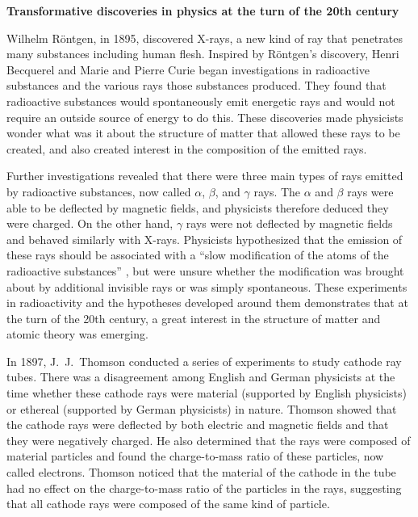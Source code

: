 \documentclass[12pt, oneside, letterpaper, fleqn]{article}
\begin{document}
\begin{center}
\textbf{Transformative discoveries in physics at the turn of the 20th
century}
\end{center}

Wilhelm R\"ontgen, in 1895, discovered X-rays, a new kind of ray that
penetrates many substances including human flesh. Inspired by
R\"ontgen's discovery, Henri Becquerel and Marie and Pierre Curie began
investigations in radioactive substances and the various rays those
substances produced. They found that radioactive substances would
spontaneously emit energetic rays and would not require an outside
source of energy to do this. These discoveries made physicists wonder
what was it about the structure of matter that allowed these rays to be
created, and also created interest in the composition of the emitted
rays.

Further investigations revealed that there were three main types of rays
emitted by radioactive substances, now called $\alpha$, $\beta$, and
$\gamma$ rays. The $\alpha$ and $\beta$ rays were able to be deflected
by magnetic fields, and physicists therefore deduced they were charged.
On the other hand, $\gamma$ rays were not deflected by magnetic fields
and behaved similarly with X-rays. Physicists hypothesized that the
emission of these rays should be associated with a ``slow modification
of the atoms of the radioactive substances'' \cite{becquerel}, but were
unsure whether the modification was brought about by additional
invisible rays or was simply spontaneous. These experiments in
radioactivity and the hypotheses developed around them demonstrates that
at the turn of the 20th century, a great interest in the structure of
matter and atomic theory was emerging.

In 1897, J.\ J.\ Thomson conducted a series of experiments to study
cathode ray tubes. There was a disagreement among English and German
physicists at the time whether these cathode rays were material
(supported by English physicists) or ethereal (supported by German
physicists) in nature. Thomson showed that the cathode rays were
deflected by both electric and magnetic fields and that they were
negatively charged. He also determined that the rays were composed of
material particles and found the charge-to-mass ratio of these
particles, now called electrons. Thomson noticed that the material of
the cathode in the tube had no effect on the charge-to-mass ratio of the
particles in the rays, suggesting that all cathode rays were composed of
the same kind of particle. 
\end{document}

